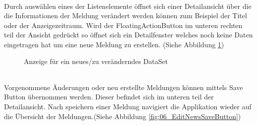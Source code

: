 \\
Durch auswählen eines der Listenelemente öffnet sich einer Detailansicht über die die Informationen der Meldung verändert werden können zum Beispiel der Titel oder der Anzeigezeitraum. Wird der FloatingActionButton im unteren rechten teil der Ansicht gedrückt so öffnet sich ein Detailfenster welches noch keine Daten eingetragen hat um eine neue Meldung zu erstellen. (Siehe Abbildung \ref{fig:06_NewNewsEdit})
\\
\begin{figure}[H]
    \centering
    \qquad
    \caption{Anzeige für ein neues/zu veränderndes DataSet}
    \label{fig:06_NewNewsEdit}
\end{figure}
\\
Vorgenommene Änderungen oder neu erstellte Meldungen können mittels Save Button übernommen werden. Dieser befindet sich im unteren teil der Detailansicht. Nach speichern einer Meldung navigiert die Applikation wieder auf die Übersicht der Meldungen.(Siehe Abbildung \ref{fig:06_EditNewsSaveButton})

